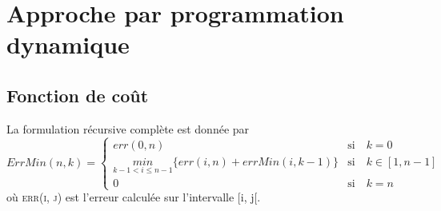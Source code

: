 \documentclass[a4paper, 12pt]{article}
\begin{document}
	\section{Approche par programmation dynamique}
	
	\subsection{Fonction de coût}
	La formulation récursive complète est donnée par
	\begin{displaymath}
    	ErrMin(n,k) =
        \left\{\begin{matrix}
        err(0,n) & \text{si}\quad k = 0\\ 
        \underset{k-1<i\leq n-1}{min}\{err(i,n) + errMin(i, k-1)\} & \text{si}\quad k\in\left[1, n-1\right]\\
        0 & \text{si}\quad k = n
        \end{matrix}\right.
	\end{displaymath}
	où \textsc{err(i, j)} est l'erreur calculée sur l'intervalle [i, j[.
\end{document}

